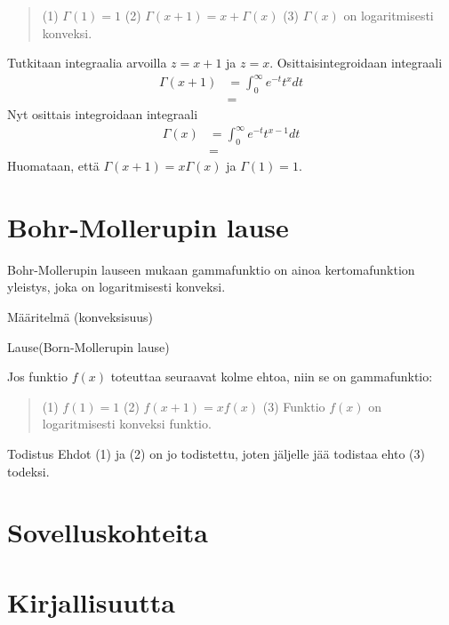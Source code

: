\documentclass[12pt]{article}
\begin{document}
\begin{quote}
    (1) $\Gamma(1)=1$ \newline
    (2) $\Gamma(x+1)=x+\Gamma(x)$ \newline
    (3) $\Gamma(x)$ on logaritmisesti konveksi.
\end{quote}
Tutkitaan integraalia arvoilla $z=x+1$ ja $z=x$. \newline
Osittaisintegroidaan integraali
\begin{align*}
    \Gamma(x+1) & = \int_{0}^{\infty} e^{-t} t^{x} dt \\
    & = 
\end{align*}
Nyt osittais integroidaan integraali \newline
\begin{align*}
    \Gamma(x) & = \int_{0}^{\infty} e^{-t} t^{x-1} dt \\
& =
\end{align*}
Huomataan, että $\Gamma(x+1) = x\Gamma(x)$ ja $\Gamma(1) = 1.$ \newline
\newpage


\section{Bohr-Mollerupin lause}
\onehalfspacing
Bohr-Mollerupin lauseen mukaan gammafunktio on ainoa kertomafunktion yleistys, joka on logaritmisesti konveksi.
\newline

Määritelmä (konveksisuus)
\newline

Lause(Born-Mollerupin lause)
\newline

Jos funktio $f(x)$ toteuttaa seuraavat kolme ehtoa, niin se on gammafunktio:
\begin{quote}
(1) $f(1)=1$ \newline
(2) $f(x+1)=xf(x)$ \newline
(3) Funktio $f(x)$ on logaritmisesti konveksi funktio.
\end{quote}

Todistus
\newline
Ehdot (1) ja (2) on jo todistettu, joten jäljelle jää todistaa ehto (3) todeksi. 

\newpage
\section{Sovelluskohteita}
\newpage
\section{Kirjallisuutta}
\onehalfspacing
[1]
\end{document}
